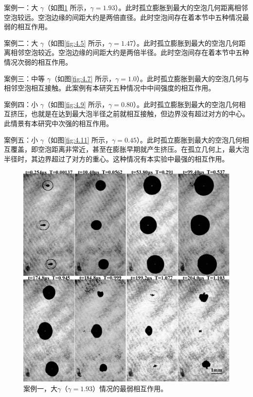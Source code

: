 案例一：大 $\gamma$（如图\ref{fig:4.3} 
所示，$\gamma=1.93$）。此时孤立膨胀到最大的空泡几何距离相邻空泡较远。空泡边缘的间距大约是两倍直径。此时空泡间存在着本节中五种情况最弱的相互作用。

案例二：大 $\gamma$（如图\ref{fig:4.5} 
所示，$\gamma=1.47$）。此时孤立膨胀到最大的空泡几何距离相邻空泡较近。空泡边缘的间距大约是两倍半径。此时空泡间存在着本节中五种情况次弱的相互作用。

案例三：中等 $\gamma$（如图\ref{fig:4.7} 
所示，$\gamma=1.0$）。此时孤立膨胀到最大的空泡几何与相邻空泡相互接触。此案例有本研究五种情况中中间强度的相互作用。

案例四：小 $\gamma$（如图\ref{fig:4.9} 
所示，$\gamma=0.80$）。此时孤立膨胀到最大的空泡几何相互挤压，也就是在达到最大泡半径之前就相互接触，但边界没有超过对方的中心。此情景有本研究中次强的相互作用。

案例五：小 $\gamma$（如图\ref{fig:4.11} 
所示，$\gamma=0.45$）。此时孤立膨胀到最大的空泡几何相互覆盖，即空泡距离非常近，甚至在膨胀早期就产生挤压。在孤立几何上，最大泡半径时，其边界超过了对方的重心。这种情况有本实验中最强的相互作用。

\begin{figure}[H]
    \centering
    \includegraphics[width=0.7\linewidth]{img/fig4.3.png}
    \caption{案例一，大$\gamma$（$\gamma=1.93$）情况的最弱相互作用。}
    \label{fig:4.3}
\end{figure}


